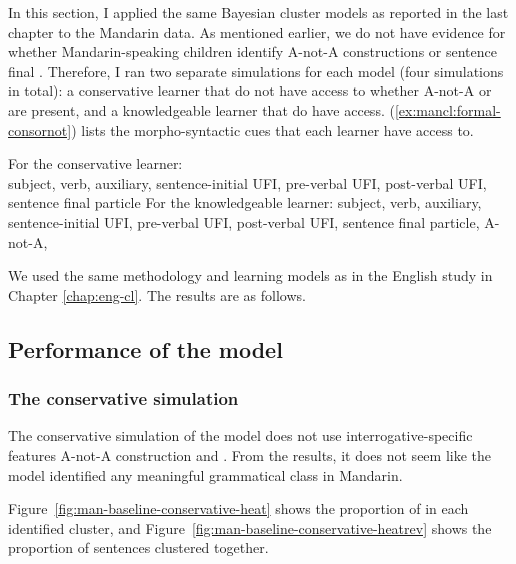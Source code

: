 In this section, I applied the same Bayesian cluster models as reported in the last chapter to the Mandarin data. As mentioned earlier, we do not have evidence for whether Mandarin-speaking children identify A-not-A constructions or sentence final . Therefore, I ran two separate simulations for each model (four simulations in total): a conservative learner that do not have access to whether A-not-A or  are present, and a knowledgeable learner that do have access. (\ref{ex:mancl:formal-consornot}) lists the morpho-syntactic cues that each learner have access to.

For the conservative learner: \\
\textpm subject, \textpm verb, \textpm auxiliary, \textpm sentence-initial UFI, \textpm pre-verbal UFI,  \textpm post-verbal UFI, \textpm sentence final particle
\ex For the knowledgeable learner:
\textpm subject, \textpm verb, \textpm auxiliary, \textpm sentence-initial UFI, \textpm pre-verbal UFI,  \textpm post-verbal UFI, \textpm sentence final particle, \textpm A-not-A, \textpm {}
\eex

We used the same methodology and learning models as in the English study in Chapter \ref{chap:eng-cl}. The results are as follows.
\subsection{Performance of the \dlearnerabbr{} model}
\label{sec:mancl:model:results:d}


\subsubsection{The conservative simulation} 
The conservative simulation of the \dlearnerabbr{} model does not use interrogative-specific features \textpm A-not-A construction and \textpm {}. From the results, it does not seem like the model identified any meaningful grammatical class in Mandarin.

Figure~\ref{fig:man-baseline-conservative-heat} shows the proportion of \diis{} in each identified cluster, and Figure~\ref{fig:man-baseline-conservative-heatrev} shows the proportion of sentences clustered together. 



